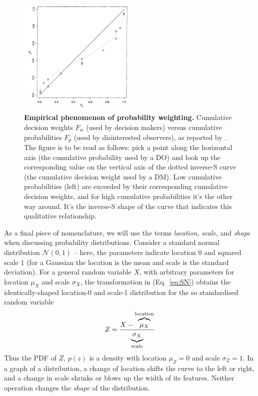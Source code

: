 \documentclass[a4paper, 12pt]{article}
\newcommand{\elabel}[1]{\label{eq:#1}}
\newcommand{\eref}[1]{(Eq.~\ref{eq:#1})}
\newcommand{\flabel}[1]{\label{fig:#1}}
\newcommand{\be}{\begin{equation}}
\newcommand{\ee}{\end{equation}}
\newcommand{\ND}{\mathcal{N}} %
\begin{document}
\begin{figure}[!htb]
\centering
\includegraphics[width=0.5\textwidth]{./figs/TK1992.PNG}
\caption{{\bf Empirical phenomenon of probability weighting.} Cumulative decision weights $F_w$ (used by decision makers) versus cumulative probabilities $F_p$ (used by disinterested observers), as reported by \cite[p.~310, Fig. 1]{TverskyKahneman1992}. The figure is to be read as follows: pick a point along the horizontal axis (the cumulative probability used by a DO) and look up the corresponding value on the vertical axis of the dotted inverse-S curve (the cumulative decision weight used by a DM). Low cumulative probabilities (left) are exceeded by their corresponding cumulative decision weights, and for high cumulative probabilities it's the other way around. It's the inverse-S shape of the curve that indicates this qualitative relationship.}
\flabel{TK1992}
\end{figure}

As a final piece of nomenclature, we will use the terms \textit{location}, \textit{scale}, and {\it shape} when discussing probability distributions. Consider a standard normal distribution $\ND(0,1)$ -- here, the parameters indicate location 0 and squared scale 1 (for a Gaussian the location is the mean and scale is the standard deviation). For a general random variable $X$, with arbitrary parameters for location $\mu_X$ and scale $\sigma_X$, the transformation in \eref{SN} obtains the identically-shaped location-0 and scale-1 distribution for the so standardised random variable
\be \elabel{SN}
	Z = \frac{X-\overbrace{\mu_X \mathstrut}^{\text{location}}}{\underbrace{\sigma_X\mathstrut}_{\text{scale}}}
\ee
Thus the PDF of $Z$, $p(z)$ is a density with location $\mu_Z=0$ and scale $\sigma_Z=1$. In a graph of a distribution, a change of location shifts the curve to the left or right, and a change in scale shrinks or blows up the width of its features. Neither operation changes the {\it shape} of the distribution.
\end{document}

